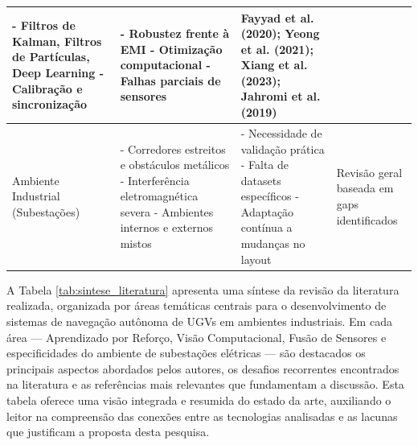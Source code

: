 \begin{table}[H]
\begin{tabularx}{\textwidth}{|l|X|X|X|}
        - Filtros de Kalman, Filtros de Partículas, Deep Learning \newline 
        - Calibração e sincronização &
        - Robustez frente à EMI \newline 
        - Otimização computacional \newline 
        - Falhas parciais de sensores &
        Fayyad et al. (2020); Yeong et al. (2021); Xiang et al. (2023); Jahromi et al. (2019) \\
        \hline
        Ambiente Industrial (Subestações) &
        - Corredores estreitos e obstáculos metálicos \newline 
        - Interferência eletromagnética severa \newline 
        - Ambientes internos e externos mistos &
        - Necessidade de validação prática \newline 
        - Falta de datasets específicos \newline 
        - Adaptação contínua a mudanças no layout &
        Revisão geral baseada em gaps identificados \\
        \hline
    \end{tabularx}
\end{table}

A Tabela \ref{tab:sintese_literatura} apresenta uma síntese da revisão da literatura realizada, organizada por áreas temáticas centrais para o desenvolvimento de sistemas de navegação autônoma de UGVs em ambientes industriais. Em cada área — Aprendizado por Reforço, Visão Computacional, Fusão de Sensores e especificidades do ambiente de subestações elétricas — são destacados os principais aspectos abordados pelos autores, os desafios recorrentes encontrados na literatura e as referências mais relevantes que fundamentam a discussão. Esta tabela oferece uma visão integrada e resumida do estado da arte, auxiliando o leitor na compreensão das conexões entre as tecnologias analisadas e as lacunas que justificam a proposta desta pesquisa.

